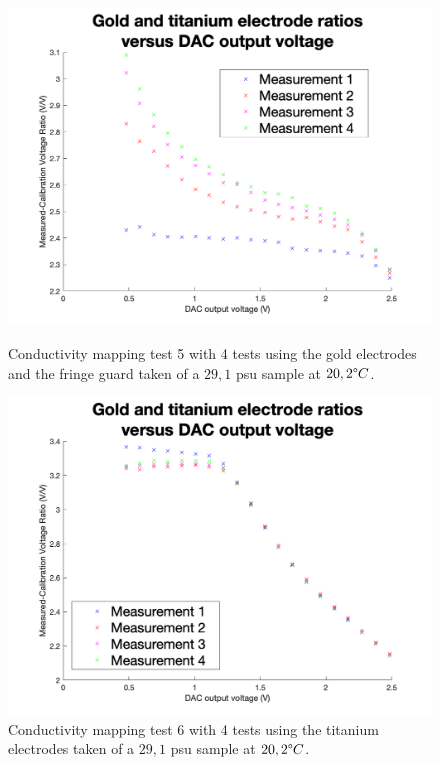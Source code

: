 \begin{figure}[ht]
    \begin{minipage}{0.5\textwidth}
        \centering
        \includegraphics[width=\textwidth]{Figures/Testing/Aus18}
        \caption{Conductivity mapping test 5 with 4 tests using the gold electrodes and the fringe guard taken of a $29,1$ \gls{psu} sample at $20,2\degree C$.}
        \label{fig:test13} %
    \end{minipage}
    \begin{minipage}{0.5\textwidth}
        \centering
        \includegraphics[width=\textwidth]{Figures/Testing/Ti18}
        \caption{Conductivity mapping test 6 with 4 tests using the titanium electrodes taken of a $29,1$ \gls{psu} sample at $20,2\degree C$.}
        \label{fig:test14} %
    \end{minipage}
\end{figure}

